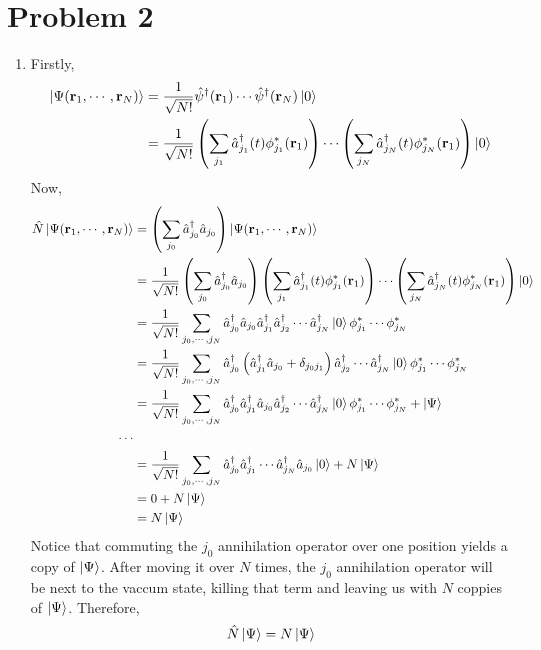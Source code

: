 \documentclass[12pt]{article}
\begin{document}
\section*{Problem 2}
\begin{enumerate}[label=(\alph*)]
    \item Firstly,
    \begin{align*}
        \ket{\Psi(\mathbf{r}_1,\cdots,\mathbf{r}_N)} &= \frac{1}{\sqrt{N!}}\hat{\psi}^\dag(\mathbf{r}_1)\cdots\hat{\psi}^\dag(\mathbf{r}_N)\ket{0} \\
        &= \frac{1}{\sqrt{N!}}\left(\sum_{j_1}\hat{a}_{j_1}^\dag(t)\phi_{j_1}^*(\mathbf{r}_1)\right)\cdots\left(\sum_{j_N}\hat{a}_{j_N}^\dag(t)\phi_{j_N}^*(\mathbf{r}_1)\right)\ket{0}
    \end{align*}
    Now,
    \begin{align*}
        \hat{N}\ket{\Psi(\mathbf{r}_1,\cdots,\mathbf{r}_N)} &= \left(\sum_{j_0}\hat{a}_{j_0}^\dag\hat{a}_{j_0}\right)\ket{\Psi(\mathbf{r}_1,\cdots,\mathbf{r}_N)} \\
        &= \frac{1}{\sqrt{N!}}\left(\sum_{j_0}\hat{a}_{j_0}^\dag\hat{a}_{j_0}\right)\left(\sum_{j_1}\hat{a}_{j_1}^\dag(t)\phi_{j_1}^*(\mathbf{r}_1)\right)\cdots\left(\sum_{j_N}\hat{a}_{j_N}^\dag(t)\phi_{j_N}^*(\mathbf{r}_1)\right)\ket{0} \\
        &= \frac{1}{\sqrt{N!}} \sum_{j_0,\cdots,j_N}\hat{a}_{j_0}^\dag\hat{a}_{j_0}\hat{a}_{j_1}^\dag\hat{a}_{j_2}^\dag\cdots\hat{a}_{j_N}^\dag\ket{0}\phi_{j_1}^*\cdots\phi_{j_N}^* \\
        &= \frac{1}{\sqrt{N!}}\sum_{j_0,\cdots,j_N}\hat{a}_{j_0}^\dag\left(\hat{a}_{j_1}^\dag\hat{a}_{j_0} + \delta_{j_0j_1}\right)\hat{a}_{j_2}^\dag\cdots\hat{a}_{j_N}^\dag\ket{0}\phi_{j_1}^*\cdots\phi_{j_N}^* \\
        &= \frac{1}{\sqrt{N!}} \sum_{j_0,\cdots,j_N}\hat{a}_{j_0}^\dag\hat{a}_{j_1}^\dag\hat{a}_{j_0}\hat{a}_{j_2}^\dag\cdots\hat{a}_{j_N}^\dag\ket{0}\phi_{j_1}^*\cdots\phi_{j_N}^* + \ket{\Psi} \\
        \cdots \\
        &= \frac{1}{\sqrt{N!}}\sum_{j_0,\cdots,j_N}\hat{a}_{j_0}^\dag\hat{a}_{j_1}^\dag\cdots\hat{a}_{j_N}^\dag\hat{a}_{j_0}\ket{0} + N\ket{\Psi} \\
        &= 0 + N\ket{\Psi} \\
        &= N\ket{\Psi}
    \end{align*}
    Notice that commuting the $j_0$ annihilation operator over one position yields a copy of $\ket{\Psi}$. After moving it over $N$ times, the $j_0$ annihilation operator will be next to the vaccum state, killing that term and leaving us with $N$ coppies of $\ket{\Psi}$. Therefore,
    \[ \hat{N}\ket{\Psi} = N\ket{\Psi} \]


\end{enumerate}
\end{document}

